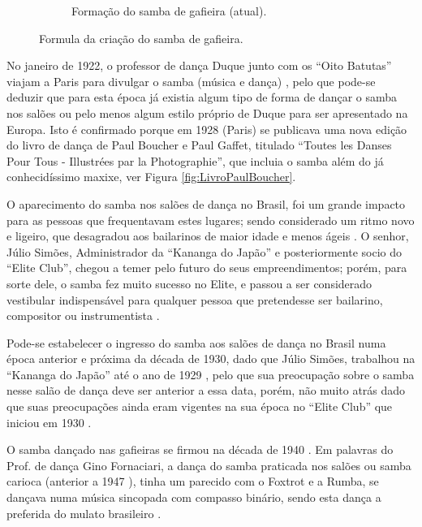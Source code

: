 \begin{figure}[h]
\begin{subfigure}[b]{0.37\textwidth}
    \caption{Formação do samba de gafieira (atual).}
    \label{fig:formuladosambagafieira2}
  \end{subfigure}
\caption{Formula da criação do samba de gafieira.}
\label{fig:formuladosambagafieiraall}
\end{figure}


No janeiro de 1922, o professor de dança Duque junto com os ``Oito Batutas'' 
viajam a Paris para divulgar o samba (música e dança)
\cite[pp. 13]{duque1922:a} \cite[pp. 465]{marcondes1977enciclopedia} \cite[pp. 1]{Dansons:1},
pelo que pode-se deduzir que para esta época já existia algum tipo de forma de dançar o samba nos salões 
ou pelo menos algum estilo próprio de Duque para ser apresentado na Europa. 
Isto é confirmado porque em 1928 (Paris) se publicava uma nova edição do livro de dança de Paul Boucher e Paul Gaffet,
titulado
``Toutes les Danses Pour Tous - Illustrées par la Photographie'',
que incluia o samba além do já conhecidíssimo maxixe, ver Figura \ref{fig:LivroPaulBoucher}.


O aparecimento do samba nos salões de dança no Brasil, 
foi um grande impacto para as pessoas que frequentavam estes lugares;
sendo considerado um ritmo novo e ligeiro,
que desagradou aos bailarinos de maior idade e menos ágeis \cite[pp. 6 - cad. B]{entrevistajuliojournalbrasil1}.
O senhor, Júlio Simões, Administrador da ``Kananga do Japão'' e posteriormente socio
do ``Elite Club'', chegou a temer pelo futuro do seus empreendimentos; porém, para sorte dele, 
o samba fez muito sucesso no Elite,
e passou a ser considerado vestibular indispensável para qualquer pessoa que pretendesse ser bailarino, 
compositor ou instrumentista \cite[pp. 6 - cad. B]{entrevistajuliojournalbrasil1}.

Pode-se estabelecer o ingresso do samba aos salões de dança no Brasil numa época anterior e próxima da década de 1930,
dado que Júlio Simões, trabalhou na ``Kananga do Japão'' até o ano de 1929 \cite[pp. 3 - cad. 3]{juliosimoes}  
\cite[pp. 11]{eliteinaugura} \cite[pp. 1 - cad. B]{gafieira2000reis}, pelo que sua preocupação sobre o samba 
nesse salão de dança deve ser anterior a essa data, porém, não muito atrás dado que 
suas preocupações ainda eram vigentes na sua época no ``Elite Club'' 
que iniciou em 1930 \cite[pp. 11]{eliteinaugura} \cite[pp. 3 - cad. 3]{juliosimoes} \cite[pp. 10]{simoesjournalbrasil1}.


O samba dançado nas gafieiras se firmou na década de 1940 \cite[pp. 142]{perna2002samba}. 
Em palavras do Prof. de dança Gino Fornaciari, 
a dança do samba praticada nos salões ou samba carioca (anterior a 1947 \cite[pp. 50]{fornaciari1947aprender}), 
 tinha um parecido com o Foxtrot e a Rumba, se dançava numa música sincopada com compasso binário,
sendo esta dança a preferida do mulato brasileiro
\cite[pp. 50-51]{fornaciari1947aprender}.


